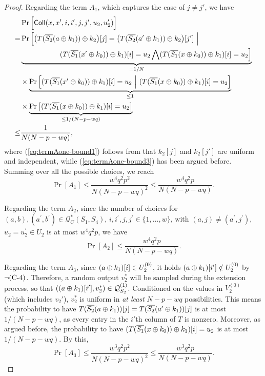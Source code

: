 \begin{proof}
Regarding the term $A_1$, which captures the case of $j\neq j'$, we have   {\small
%
\begin{align}
  &  \Pr\Big[\mathsf{Coll}(x,x',i,i',j,j',u_2,u_2')\Big]     \notag   \\
= &  \Pr\Big[\big(T(\overline{S_2}(a\oplus k_1))\oplus k_2\big)[j]=\big(T(\overline{S_2}(a'\oplus k_1))\oplus k_2\big)[j'] ~\Big|		\notag	 \\
&\underbrace{\ \ \ \ \ \ \ \ \ \ \ \ \ \ \ \ (T(\overline{S_1}(x'\oplus k_0))\oplus k_1)[i]=u_2 \bigwedge (T(\overline{S_1}(x\oplus k_0))\oplus k_1)[i]=u_2 \Big]}_{=1/N}  
\label{eq:termAone-bound1}  \\
&  \times  \underbrace{\Pr\Big[(T(\overline{S_1}(x'\oplus k_0))\oplus k_1)[i]=u_2 ~\Big|~ (T(\overline{S_1}(x\oplus k_0))\oplus k_1)[i]=u_2\Big]}_{\leq 1}     \\
&  \times  \underbrace{\Pr\big[(T(\overline{S_1}(x\oplus k_0))\oplus k_1)[i]=u_2\big]}_{\leq 1/(N-p-wq)}     \label{eq:termAone-bound3}     \\
\leq  &  \frac{1}{N(N-p-wq)},
\end{align}
}%
%
where (\ref{eq:termAone-bound1}) follows from that $k_2[j]$ and $k_2[j']$ are uniform and independent, while (\ref{eq:termAone-bound3}) has been argued before. Summing over all the possible choices, we reach
%
$$\Pr[A_1]\leq\frac{w^4q^2p^2}{N(N-p-wq)^2}\leq\frac{w^4q^2p}{N(N-p-wq)}.$$



Regarding the term $A_2$, since the number of choices for $(a, b), (a^{\prime}, b^{\prime}) \in \mathcal{Q}_{C}^{*}\left(S_{1}, S_{4}\right)$, $i, i^{\prime},j, j^{\prime} \in\{1, \ldots, w\}$, with $(a, j) \neq \left(a^{\prime}, j^{\prime}\right)$, $u_{2}=u_{2}^{\prime} \in U_{2}$ is at most $w^4q^2p$, we have
%
$$\Pr[A_2]\leq\frac{w^4q^2p}{N(N-p-wq)}.$$





Regarding the term $A_3$, since $(a\oplus k_1)[i]\in U_2^{(0)}$, it holds $(a\oplus k_1)[i']\notin U_2^{(0)}$ by $\neg\text{(C-4)}$. Therefore, a random output $v_2^*$ will be sampled during the extension process, so that $((a\oplus k_1)[i'],v_2^*)\in\mathcal{Q}_{S_2}^{(1)}$. Conditioned on the values in $V_2^{(0)}$ (which includes $v_2'$), $v_2^*$ is uniform in {\it at least} $N-p-wq$ possibilities. This means the probability to have $T(\overline{S_2}(a\oplus k_1))[j]=T(\overline{S_2}(a'\oplus k_1))[j]$ is at most $1/(N-p-wq)$, as every entry in the $i'$th column of $T$ is nonzero. Moreover, as argued before, the probability to have $(T(\overline{S_1}(x\oplus k_0))\oplus k_1)[i]=u_2$ is at most $1/(N-p-wq)$. By this,
%
$$\Pr[A_3]\leq\frac{w^3q^2p^2}{N(N-p-wq)^2}\leq\frac{w^3q^2p}{N(N-p-wq)}.$$





\end{proof}
